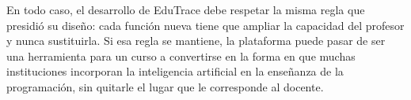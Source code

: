 \documentclass[letterpaper, 10 pt, conference]{ieeeconf}
\begin{document}
En todo caso, el desarrollo de EduTrace debe respetar la misma regla que presidió su diseño: cada función nueva tiene que ampliar la capacidad del profesor y nunca sustituirla.
Si esa regla se mantiene, la plataforma puede pasar de ser una herramienta para un curso a convertirse en la forma en que muchas instituciones incorporan la inteligencia artificial en la enseñanza de la programación, sin quitarle el lugar que le corresponde al docente.








\end{document}
